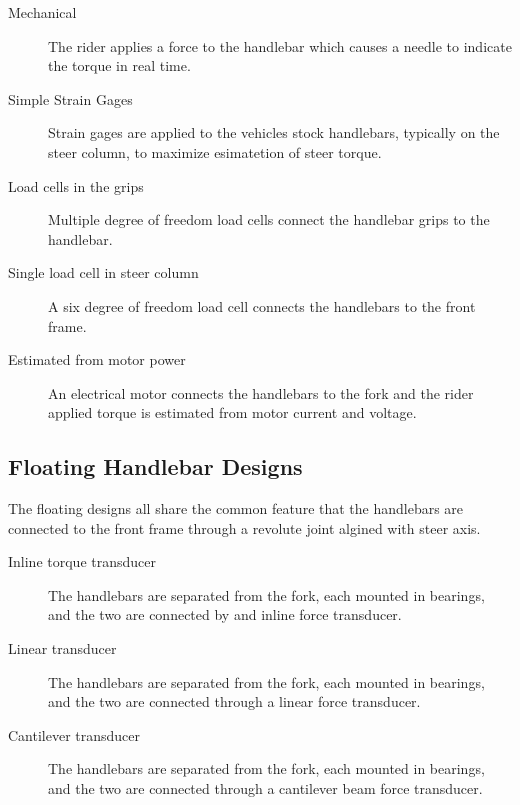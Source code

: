 \documentclass[10pt]{article}
\begin{document}
\begin{description}
  \item[Mechanical] The rider applies a force to the handlebar which causes a
    needle to indicate the torque in real time.
    \cite{Wilson-Jones1951,Cheng2003,Moore2012}
  \item[Simple Strain Gages] Strain gages are applied to the vehicles stock
    handlebars, typically on the steer column, to maximize esimatetion of steer
    torque. \cite{Eaton1973,Lorenzo1997}
  \item[Load cells in the grips] Multiple degree of freedom load cells connect
    the handlebar grips to the handlebar. \cite{Evertse2010}
  \item[Single load cell in steer column] A six degree of freedom load cell
    connects the handlebars to the front frame. \cite{Kageyama?}
  \item[Estimated from motor power] An electrical motor connects the handlebars
    to the fork and the rider applied torque is estimated from motor current
    and voltage. \cite{Iuchi2006}
\end{description}


\subsection*{Floating Handlebar Designs}

The floating designs all share the common feature that the handlebars are
connected to the front frame through a revolute joint algined with steer axis.

\begin{description}
  \item[Inline torque transducer] The handlebars are separated from the fork,
    each mounted in bearings, and the two are connected by and inline force
    transducer. \cite{Weir1979a,Cain2010,Cain2012,Moore2012}
  \item[Linear transducer] The handlebars are separated from the fork, each
    mounted in bearings, and the two are connected through a linear force
    transducer. \cite{James2002}
  \item[Cantilever transducer] The handlebars are separated from the fork, each
    mounted in bearings, and the two are connected through a cantilever beam
    force transducer. \cite{Bortoluzzi2000,Biral2003,Teerhuis2010,Ouden2011}
\end{description}
\end{document}
